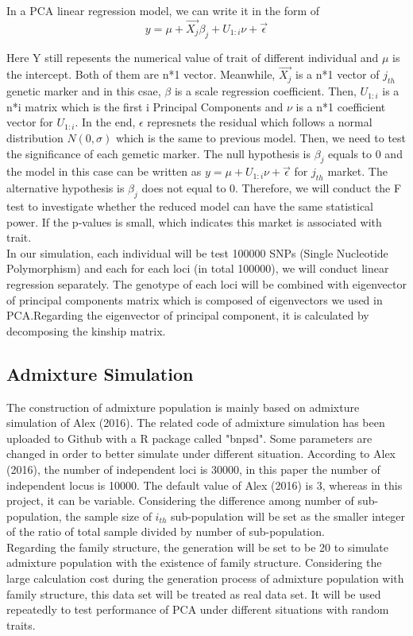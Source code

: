 \documentclass[12pt]{article}
\begin{document}
In a PCA linear regression model, we can write it in the form of $$y=\mu+ \vec{X_{j}} {\beta}_{j}+U_{1:i} \nu+\vec{\epsilon}$$

Here Y still repesents the numerical value of trait of different individual and $\mu$ is the intercept. Both of them are n*1 vector. Meanwhile, $\vec{X_{j}}$ is a n*1 vector of $j_{th}$ genetic marker and in this csae, $\beta$ is a scale regression coefficient. Then, $U_{1:i}$ is a n*i matrix which is the first i Principal Components and $\nu$ is a n*1 coefficient vector for $U_{1:i}$. In the end, $\epsilon$ represnets the residual which follows a normal distribution $N(0,\sigma)$ which is the same to previous model. Then, we need to test the significance of each gemetic marker. The null hypothesis is ${\beta}_{j}$ equals to 0 and the model in this case can be written as $y=\mu+U_{1:i} \nu+\vec{\epsilon}$ for $j_{th}$ market. The alternative hypothesis is ${\beta}_{j}$ does not equal to 0. Therefore, we will conduct the F test to investigate whether the reduced model can have the same statistical power. If the p-values is small, which indicates this market is associated with trait.\\

In our simulation, each individual will be test 100000 SNPs (Single Nucleotide Polymorphism) and each for each loci (in total 100000), we will conduct linear regression separately.  The genotype of each loci will be combined with eigenvector of principal components matrix which is composed of eigenvectors we used in PCA.Regarding the eigenvector of principal component, it is calculated by decomposing the kinship matrix.  

\subsection{Admixture Simulation}
The construction of admixture population is mainly based on admixture simulation of Alex (2016). The related code of admixture simulation has been uploaded to Github with a R package called "bnpsd".  Some parameters are changed in order to better simulate under different situation. According to Alex (2016), the number of independent loci is 30000, in this paper the number of independent locus is 10000. The default value of Alex (2016) is 3, whereas in this project, it can be variable. Considering the difference among number of sub-population, the sample size of $i_{th}$ sub-population will be set as the smaller integer of the ratio of total sample divided by number of sub-population.\\
Regarding the family structure, the generation will be set to be 20 to simulate admixture population with the existence of family structure. Considering the large calculation cost during the generation process of admixture population with family structure, this data set will be treated as real data set. It will be used repeatedly to test performance of PCA under different situations with random traits.
\end{document}
